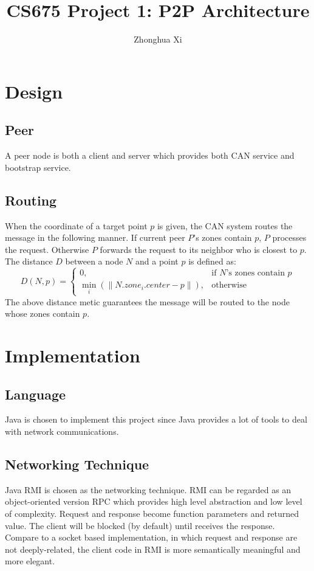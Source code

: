 \documentclass[11pt, oneside]{article}   	%
\title{CS675 Project 1: P2P Architecture}
\author{Zhonghua Xi}
\begin{document}
\maketitle

\section{Design}
\subsection{Peer}
A peer node is both a client and server which provides both CAN service and bootstrap service.

\subsection{Routing}
When the coordinate of a target point $p$ is given, the CAN system routes the message in the following manner.
If current peer $P$'s zones contain $p$, $P$ processes the request. Otherwise $P$ forwards the request to its neighbor who is closest to $p$. The distance $D$ between a node $N$ and a point $p$ is defined as: 
\begin{equation}
D(N,p) = 
\begin{cases}
    0, 										& \text{if } N \text{'s zones contain } p \\
 	\min\limits_{i}(\lVert N.zone_i.center - p \rVert),      & \text{otherwise}
\end{cases}
\end{equation}
The above distance metic guarantees the message will be routed to the node whose zones contain $p$.


\section{Implementation}

\subsection{Language}
Java is chosen to implement this project since Java provides a lot of tools to deal with network communications.

\subsection{Networking Technique}
Java RMI is chosen as the networking technique. RMI can be regarded as an object-oriented version RPC which provides high level abstraction and low level of complexity.
Request and response become function parameters and returned value. 
The client will be blocked (by default) until receives the response. 
Compare to a socket based implementation, in which request and response are not deeply-related, the client code in RMI is more semantically meaningful and more elegant.
\end{document}
